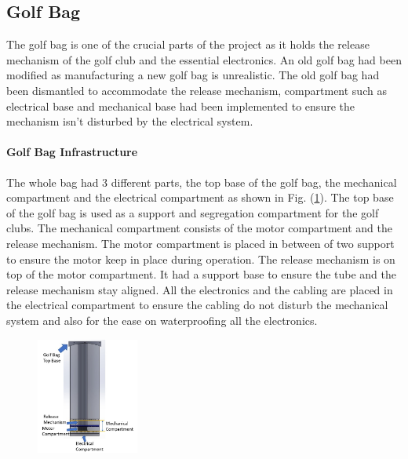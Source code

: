 \documentclass[11pt,landscape]{article}
\begin{document}
\newpage
\begin{multicols}{3}
\subsection{Golf Bag}
The golf bag is one of the crucial parts of the project as it holds the release
mechanism of the golf club and the essential electronics. An old golf bag had
been modified as manufacturing a new golf bag is unrealistic. The old golf bag
had been dismantled to accommodate the release mechanism, compartment such as
electrical base and mechanical base had been implemented to ensure the mechanism
isn't disturbed by the electrical system. 

\paragraph{Golf Bag Infrastructure}
The whole bag had 3 different parts, the top base of the golf bag, the
mechanical compartment and the electrical compartment as shown in Fig. (\ref{fig:golf_bag}). The top base of the golf bag is used as a support and segregation
compartment for the golf clubs. The mechanical compartment consists of the motor
compartment and the release mechanism. The motor compartment is placed in
between of two support to ensure the motor keep in place during operation. The
release mechanism is on top of the motor compartment. It had a support base to
ensure the tube and the release mechanism stay aligned. All the electronics and
the cabling are placed in the electrical compartment to ensure the cabling do
not disturb the mechanical system and also for the ease on waterproofing all the
electronics.

\begin{figure}[H]
    \begin{center}
        \includegraphics[width=0.3\textwidth]{Golfbag.png}
        \label{fig:golf_bag}
    \end{center}
\end{figure}


\end{multicols}
\end{document}
